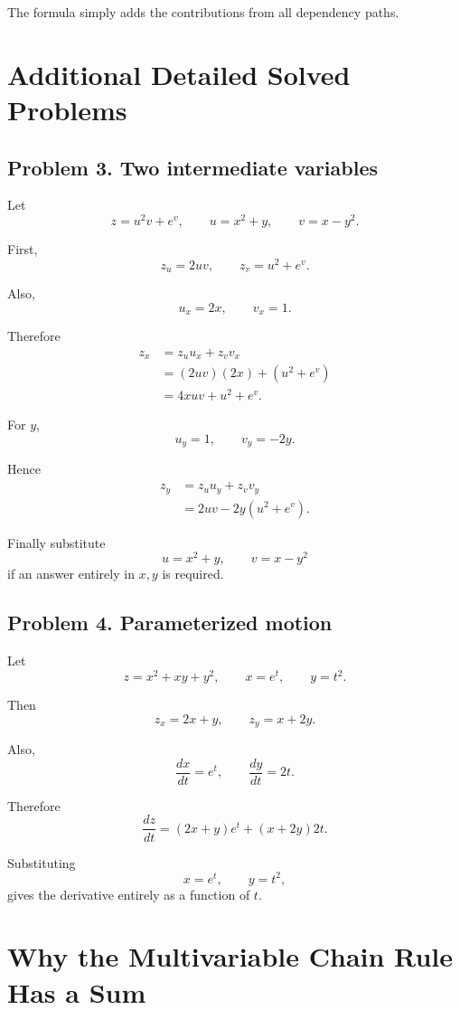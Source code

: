 \documentclass[11pt,oneside]{book}
\theoremstyle{studentthm}
\theoremstyle{definition}
\begin{document}
The formula simply adds the contributions from all dependency paths.

\section{Additional Detailed Solved Problems}

\subsection*{Problem 3. Two intermediate variables}

Let
\[
z=u^2v+e^v,
\qquad
u=x^2+y,
\qquad
v=x-y^2.
\]

First,
\[
z_u=2uv,
\qquad
z_v=u^2+e^v.
\]

Also,
\[
u_x=2x,\qquad v_x=1.
\]

Therefore
\[
\begin{aligned}
z_x
&=
z_u u_x+z_v v_x\\
&=
(2uv)(2x)+(u^2+e^v)\\
&=
4xuv+u^2+e^v.
\end{aligned}
\]

For \(y\),
\[
u_y=1,\qquad v_y=-2y.
\]

Hence
\[
\begin{aligned}
z_y
&=
z_u u_y+z_v v_y\\
&=
2uv-2y(u^2+e^v).
\end{aligned}
\]

Finally substitute
\[
u=x^2+y,\qquad v=x-y^2
\]
if an answer entirely in \(x,y\) is required.

\subsection*{Problem 4. Parameterized motion}

Let
\[
z=x^2+xy+y^2,
\qquad
x=e^t,
\qquad
y=t^2.
\]

Then
\[
z_x=2x+y,
\qquad
z_y=x+2y.
\]

Also,
\[
\frac{dx}{dt}=e^t,
\qquad
\frac{dy}{dt}=2t.
\]

Therefore
\[
\frac{dz}{dt}
=
(2x+y)e^t
+
(x+2y)2t.
\]

Substituting
\[
x=e^t,\qquad y=t^2,
\]
gives the derivative entirely as a function of \(t\).



\section{Why the Multivariable Chain Rule Has a Sum}
\end{document}
